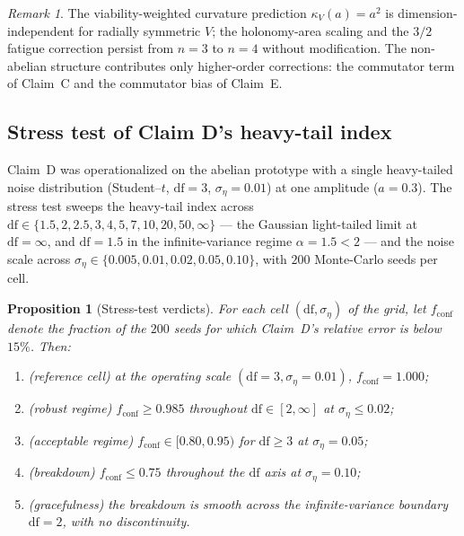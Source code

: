 \documentclass[11pt,a4paper]{article}
\theoremstyle{plain}
\newtheorem{proposition}[theorem]{Proposition}
\theoremstyle{definition}
\theoremstyle{remark}
\newtheorem{remark}[theorem]{Remark}
\newcommand{\kk}{\kappa_{\!V}}
\begin{document}
\begin{remark}
The viability-weighted curvature prediction $\kk(a)=a^{2}$ is
dimension-independent for radially symmetric $V$; the
holonomy-area scaling and the $3/2$ fatigue correction persist
from $n=3$ to $n=4$ without modification. The non-abelian
structure contributes only higher-order corrections: the
commutator term of Claim~C and the commutator bias of Claim~E.
\end{remark}

\subsection{Stress test of Claim D's heavy-tail index}
\label{sec:verdict-stress}

Claim~D was operationalized on the abelian prototype with a single
heavy-tailed noise distribution (Student--$t$, $\mathrm{df}=3$,
$\sigma_\eta=0.01$) at one amplitude ($a=0.3$). The stress test
sweeps the heavy-tail index across
$\mathrm{df}\in\{1.5,2,2.5,3,4,5,7,10,20,50,\infty\}$ --- the
Gaussian light-tailed limit at $\mathrm{df}=\infty$, and
$\mathrm{df}=1.5$ in the infinite-variance regime $\alpha=1.5<2$
--- and the noise scale across
$\sigma_\eta\in\{0.005,0.01,0.02,0.05,0.10\}$, with $200$
Monte-Carlo seeds per cell.

\begin{proposition}[Stress-test verdicts]\label{prop:stress}
For each cell $(\mathrm{df},\sigma_\eta)$ of the grid, let
$f_{\mathrm{conf}}$ denote the fraction of the $200$ seeds for
which Claim~D's relative error is below $15\%$. Then:
\begin{enumerate}[leftmargin=*,itemsep=1pt]
\item (reference cell) at the operating scale
  $(\mathrm{df}=3,\sigma_\eta=0.01)$,
  $f_{\mathrm{conf}}=1.000$;
\item (robust regime) $f_{\mathrm{conf}}\geq0.985$ throughout
  $\mathrm{df}\in[2,\infty]$ at $\sigma_\eta\leq0.02$;
\item (acceptable regime) $f_{\mathrm{conf}}\in[0.80,0.95)$ for
  $\mathrm{df}\geq3$ at $\sigma_\eta=0.05$;
\item (breakdown) $f_{\mathrm{conf}}\leq0.75$ throughout the
  $\mathrm{df}$ axis at $\sigma_\eta=0.10$;
\item (gracefulness) the breakdown is smooth across the
  infinite-variance boundary $\mathrm{df}=2$, with no
  discontinuity.
\end{enumerate}
\end{proposition}
\end{document}
